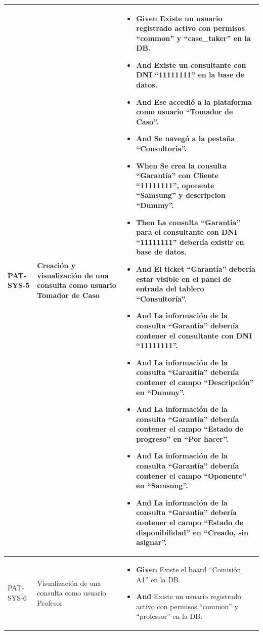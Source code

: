 \begin{longtable}{|p{1cm}|p{2.5cm}|p{12cm}|}
    \hline
    PAT-SYS-5 & Creación y visualización de una consulta como usuario Tomador de Caso & 
    \begin{itemize}
        \item \textbf{Given} Existe un usuario registrado activo con permisos ``common'' y ``case\_taker'' en la DB.
        \item \textbf{And} Existe un consultante con DNI ``11111111'' en la base de datos.
        \item \textbf{And} Ese accedió a la plataforma como usuario ``Tomador de Caso''.
        \item \textbf{And} Se navegó a la pestaña ``Consultoría''.
        \newline
        \item \textbf{When} Se crea la consulta ``Garantía'' con Cliente ``11111111'', oponente ``Samsung'' y descripcion ``Dummy''.
        \newline
        \item \textbf{Then} La consulta ``Garant\'ia'' para el consultante con DNI ``11111111'' deberı\'ia existir en base de datos.
        \item \textbf{And} El ticket ``Garant\'ia'' deber\'ia estar visible en el panel de entrada del tablero ``Consultoría''.
        \item \textbf{And} La información de la consulta ``Garant\'ia'' deberı\'ia contener el consultante con DNI ``11111111''.
        \item \textbf{And} La información de la consulta ``Garant\'ia'' deberı\'ia contener el campo ``Descripción'' en ``Dummy''.
        \item \textbf{And} La información de la consulta ``Garant\'ia'' deberı\'ia contener el campo ``Estado de progreso'' en ``Por hacer''.
        \item \textbf{And} La información de la consulta ``Garant\'ia'' deberı\'ia contener el campo ``Oponente'' en ``Samsung''.
        \item \textbf{And} La información de la consulta ``Garant\'ia'' deber\'ia contener el campo ``Estado de disponibilidad'' en ``Creado, sin asignar''.
    \end{itemize}
    \\
    \hline
    PAT-SYS-6 & Visualización de una consulta como usuario Profesor & 
        \begin{itemize}
        \item \textbf{Given} Existe el board ``Comisión A1'' en la DB.
        \item \textbf{And} Existe un usuario registrado activo con permisos ``common'' y ``professor'' en la DB.

\end{itemize}
\end{longtable}
